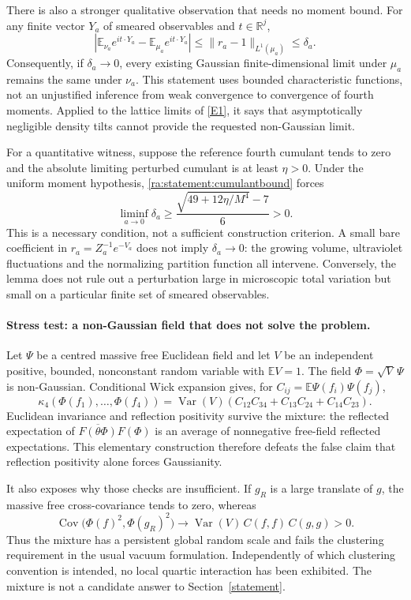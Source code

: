 \documentclass[11pt]{article}
\newcommand{\R}{\mathbb{R}}
\newcommand{\E}{\mathbb{E}}
\newcommand{\eref}[2]{\hyperlink{extra:#1:#2}{[E#2]}}
\begin{document}
There is also a stronger qualitative observation that needs no moment
bound. For any finite vector $Y_a$ of smeared observables and $t\in\R^j$,
\begin{equation}\label{ra:statement:characteristic}
 \left|\E_{\nu_a}e^{i t\cdot Y_a}-\E_{\mu_a}e^{i t\cdot Y_a}\right|
 \le\|r_a-1\|_{L^1(\mu_a)}\le\delta_a.
\end{equation}
Consequently, if $\delta_a\to0$, every existing Gaussian finite-dimensional
limit under $\mu_a$ remains the same under $\nu_a$. This statement uses
bounded characteristic functions, not an unjustified inference from weak
convergence to convergence of fourth moments. Applied to the lattice
limits of \eref{statement}{1}, it says that asymptotically negligible density
tilts cannot provide the requested non-Gaussian limit.

For a quantitative witness, suppose the reference fourth cumulant tends
to zero and the absolute limiting perturbed cumulant is at least $\eta>0$.
Under the uniform moment hypothesis, \eqref{ra:statement:cumulantbound} forces
\[
 \liminf_{a\to0}\delta_a
 \ge \frac{\sqrt{49+12\eta/M^4}-7}{6}>0.
\]
This is a necessary condition, not a sufficient construction criterion.
A small bare coefficient in $r_a=Z_a^{-1}e^{-V_a}$ does not imply
$\delta_a\to0$: the growing volume, ultraviolet fluctuations and the
normalizing partition function all intervene. Conversely, the lemma does
not rule out a perturbation large in microscopic total variation but small
on a particular finite set of smeared observables.

\paragraph{Stress test: a non-Gaussian field that does not solve the problem.}
Let $\Psi$ be a centred massive free Euclidean field and let $V$ be an
independent positive, bounded, nonconstant random variable with $\E V=1$.
The field $\Phi=\sqrt V\,\Psi$ is non-Gaussian. Conditional Wick expansion
gives, for $C_{ij}=\E\Psi(f_i)\Psi(f_j)$,
\[
 \kappa_4(\Phi(f_1),\ldots,\Phi(f_4))
 =\operatorname{Var}(V)
   (C_{12}C_{34}+C_{13}C_{24}+C_{14}C_{23}).
\]
Euclidean invariance and reflection positivity survive the mixture:
the reflected expectation of $\overline{F(\theta\Phi)}F(\Phi)$ is an
average of nonnegative free-field reflected expectations. This elementary
construction therefore defeats the false claim that reflection positivity
alone forces Gaussianity.

It also exposes why those checks are insufficient. If $g_R$ is a large
translate of $g$, the massive free cross-covariance tends to zero, whereas
\[
 \operatorname{Cov}\bigl(\Phi(f)^2,\Phi(g_R)^2\bigr)
 \longrightarrow
 \operatorname{Var}(V)\,C(f,f)\,C(g,g)>0.
\]
Thus the mixture has a persistent global random scale and fails the
clustering requirement in the usual vacuum formulation. Independently of
which clustering convention is intended, no local quartic interaction has
been exhibited. The mixture is not a candidate answer to Section~\ref{statement}.
\end{document}
